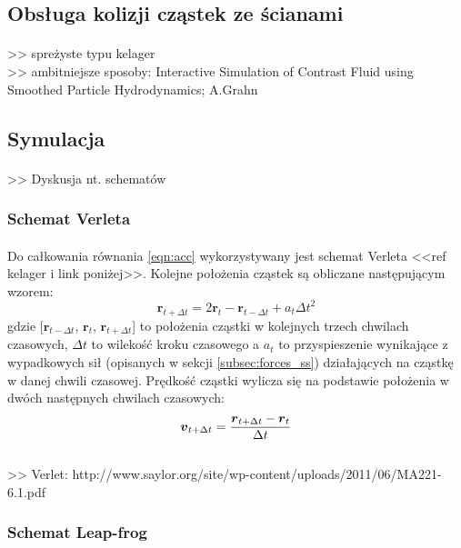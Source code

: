 \subsection{Obsługa kolizji cząstek ze ścianami}

\paragraph{}
{\noindent\color{red}>> spreżyste typu kelager\\}
{\color{red}>> ambitniejsze sposoby: Interactive Simulation of Contrast Fluid using Smoothed Particle Hydrodynamics; A.Grahn}
\par

\subsection{Symulacja}
\label{subsec:integration_ss}

\paragraph{}
{\color{red}>> Dyskusja nt. schematów}
\par

\subsubsection{Schemat Verleta}
\paragraph{}
Do całkowania równania \eqref{eqn:acc} wykorzystywany jest schemat Verleta <<ref kelager i link poniżej>>. Kolejne położenia cząstek są obliczane następującym wzorem:
\begin{equation}
\boldsymbol{r}_{t+\Delta t} = 2\boldsymbol{r}_t - \boldsymbol{r}_{t-\Delta t} + a_t\Delta t^2
\label{eqn:verlet_pos_int}
\end{equation}
gdzie [$\boldsymbol{r}_{t-\Delta t}$, $\boldsymbol{r}_{t}$, $\boldsymbol{r}_{t+\Delta t}$] to położenia cząstki w kolejnych trzech chwilach czasowych, ${\Delta t}$ to wilekość kroku czasowego a $a_t$ to przyspieszenie wynikające z wypadkowych sił (opisanych w sekcji \eqref{subsec:forces_ss}) działających na cząstkę w danej chwili czasowej. Prędkość cząstki wylicza się na podstawie położenia w dwóch następnych chwilach czasowych:
\begin{equation}
\boldsymbol{v}_{t+\Delta t} = {\boldsymbol{r}_{t+\Delta t} - \boldsymbol{r}_{t} \over \Delta t}
\label{eqn:verlet_vel_int}
\end{equation}
{\color{red}\\>> Verlet: http://www.saylor.org/site/wp-content/uploads/2011/06/MA221-6.1.pdf}
\par

\subsubsection{Schemat Leap-frog}
\paragraph{}

\par


